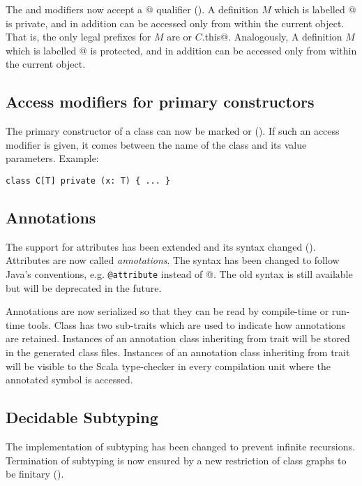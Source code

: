 The \lstinline@private@ and \lstinline@protected@ modifiers now accept
a \lstinline@[this]@ qualifier (). A definition $M$ which is labelled
\lstinline@private[this]@ is private, and in addition can be accessed
only from within the current object. That is, the only legal prefixes
for $M$ are \lstinline@this@ or \lstinline@$C$.this@.  Analogously, A
definition $M$ which is labelled \lstinline@protected[this]@ is
protected, and in addition can be accessed only from within the
current object.

\subsection*{Access modifiers for primary constructors}

The primary constructor of a class can now be marked  or
 (). If such an access modifier is given, it comes
between the name of the class and its value parameters. Example:
\begin{lstlisting}
class C[T] private (x: T) { ... }
\end{lstlisting}

\subsection*{Annotations}

The support for attributes has been extended and its syntax changed
().  Attributes are now called {\em
  annotations}. The syntax has been changed to follow Java's
conventions, e.g. \lstinline^@attribute^ instead of
\lstinline@[attribute]@. The old syntax is still available but will be
deprecated in the future.

Annotations are now serialized so that they can be read by
compile-time or run-time tools. Class  has two
sub-traits which are used to indicate how annotations are
retained. Instances of an annotation class inheriting from trait
 will be stored in the generated class
files. Instances of an annotation class inheriting from trait
 will be visible to the Scala type-checker
in every compilation unit where the annotated symbol is accessed. 

\subsection*{Decidable Subtyping}

The implementation of subtyping has been changed to prevent infinite
recursions. Termination of subtyping is now ensured by a new
restriction of class graphs to be finitary
().



